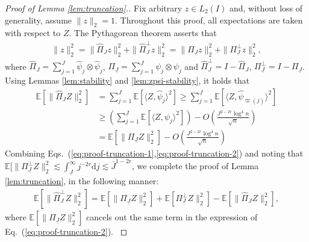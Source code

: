 \documentclass[aos]{imsart}
\renewcommand{\hat}{\widehat}
\renewcommand{\bar}{\overline}
\newcommand{\ud}{\mathrm d}
\newcommand{\und}{\underline}
\newcommand{\pd}[1]{%
	{ \color{blue} PD: #1}%
}
\theoremstyle{plain}
\theoremstyle{definition}
\theoremstyle{definition}
\begin{document}
\begin{appendix}
\begin{proof}[Proof of Lemma \ref{lem:truncation}.]
Fix arbitrary $z\in L_2(I)$ and, without loss of generality, assume $\|z\|_2=1$.
Throughout this proof, all expectations are taken with respect to $Z$.
The Pythagorean theorem asserts that
\begin{align}
\|z\|_2^2 = \|\hat\Pi_{J}z\|_2^2+\|\hat\Pi_{J}^\perp z\|_2^2 = \|\Pi_{\und J}z\|_2^2+\|\Pi_{\und J}^\perp z\|_2^2,
\label{eq:proof-truncation-1}
\end{align}
where $\hat\Pi_J=\sum_{j=1}^J\hat\psi_j\otimes\hat\psi_j$, $\Pi_{\und J}=\sum_{j=1}^{\und J}\psi_j\otimes\psi_j$ and $\hat\Pi_J^\perp=I-\hat\Pi_J$, $\Pi_{\und J}^\perp = I-\Pi_{\und J}$.
Using Lemmas \ref{lem:stability} and \ref{lem:zpsi-stability}, it holds that
\begin{align}
\mathbb E[\|\hat\Pi_J Z\|_2^2] &= \sum_{j=1}^J \mathbb E[\langle Z,\hat\psi_j\rangle^2] \geq \sum_{j=1}^{\und J}\mathbb E[\langle Z,\hat\psi_{\varpi(j)}\rangle^2]\nonumber\\
&\geq \left(\sum_{j=1}^{\und J}\mathbb E[\langle Z,\psi_j\rangle^2]\right) - O\left(\frac{J^{2-2r}\log^4 n}{\sqrt{n}}\right)\nonumber\\
&= \mathbb E[\|\Pi_{\und J} Z\|_2^2] -O\left(\frac{J^{2-2r}\log^4 n}{\sqrt{n}}\right) \label{eq:proof-truncation-2}
\end{align}
Combining Eqs.~(\ref{eq:proof-truncation-1},\ref{eq:proof-truncation-2}) and noting that $\mathbb E[\|\Pi_{\und J}^\perp Z\|_2^2 \lesssim \int_{\und J}^{\infty} j^{-2r}\ud j \lesssim \bar J^{1-2r}$, 
we complete the proof of Lemma \ref{lem:truncation}, in the following manner:
{\color{magenta}
\begin{align*}
\mathbb E[\|\hat\Pi_J^\perp Z\|_2^2] = \mathbb E[\|\Pi_{\und J} Z\|_2^2] + \mathbb E[\Pi_{\und J}^\perp Z\|_2^2] - \mathbb E[\|\hat\Pi_J Z\|_2^2],
\end{align*}
where $\mathbb E[\|\Pi_{\und J} Z\|_2^2]$ cancels out the same term in the expression of Eq.~(\ref{eq:proof-truncation-2}).
}
\end{proof}
\end{appendix}
\end{document}
